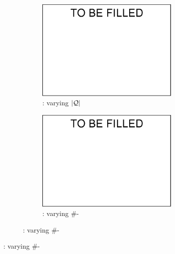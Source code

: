 {\begin{figure}[tb!]
\begin{subfigure}[b]{1.00\textwidth}
        \begin{subfigure}[b]{0.245\textwidth}
			\centering
			\includegraphics[width=1\textwidth]{fig/a.eps}
			\begin{center}
				\vspace{-2ex}\caption{\tpcds: varying $|\mathcal Q|$}
				\label{tpcds-1-varyQ} 
			\end{center}
			\vspace{-1ex}
        \end{subfigure}
        \begin{subfigure}[b]{0.245\textwidth}
          \centering
          \includegraphics[width=1\textwidth]{fig/a.eps}
          \begin{center}
            \vspace{-2ex}\caption{\tpcds: varying \#-}

\end{center}
\end{subfigure}
\end{subfigure}
\end{figure}}
